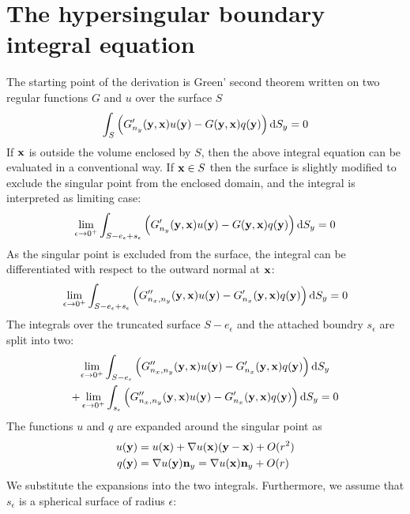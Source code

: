 \documentclass[a4paper,11pt]{article}
\newcommand{\td}{\mathrm{d}}
\begin{document}
\section{The hypersingular boundary integral equation}

The starting point of the derivation is Green' second theorem written on two regular functions $G$ and $u$ over the surface $S$
%
\begin{equation}
\int_{S} \left( G'_{n_y}({\bf y}, {\bf x}) u({\bf y}) - G({\bf y}, {\bf x}) q({\bf y})
\right) \td S_y = 0
\end{equation}
%
If ${\bf x}$ is outside the volume enclosed by $S$, then the above integral equation can be evaluated in a conventional way.
If ${\bf x} \in S$ then the surface is slightly modified to exclude the singular point from the enclosed domain, and the integral is interpreted as limiting case:
%
\begin{equation}
\lim_{\epsilon \to 0^+}
\int_{S-e_{\epsilon}+s_{\epsilon}}
\left(
G'_{n_y}({\bf y}, {\bf x}) u({\bf y}) - G({\bf y}, {\bf x}) q({\bf y})
\right) 
\td S_y = 0
\end{equation}
%
As the singular point is excluded from the surface, the integral can be differentiated with respect to the outward normal at ${\bf x}$:
%
\begin{equation}
\lim_{\epsilon \to 0^+}
\int_{S-e_{\epsilon}+s_{\epsilon}}
\left(
G''_{n_x,n_y}({\bf y}, {\bf x}) u({\bf y}) - G'_{n_x}({\bf y}, {\bf x}) q({\bf y})
\right)
\td S_y = 0
\end{equation}
%
The integrals over the truncated surface $S-e_{\epsilon}$ and the attached boundry $s_{\epsilon}$ are split into two:
%
\begin{multline}
\lim_{\epsilon \to 0^+}
\int_{S-e_{\epsilon}}
\left(
G''_{n_x,n_y}({\bf y}, {\bf x}) u({\bf y}) - G'_{n_x}({\bf y}, {\bf x}) q({\bf y})
\right)
\td S_y
\\
+
\lim_{\epsilon \to 0^+}
\int_{s_{\epsilon}}
\left(
G''_{n_x,n_y}({\bf y}, {\bf x}) u({\bf y}) - G'_{n_x}({\bf y}, {\bf x}) q({\bf y})
\right)
\td S_y = 0
\end{multline}
%
The functions $u$ and $q$ are expanded around the singular point as
%
\begin{align}
u({\bf y}) &= u({\bf x}) + \nabla u({\bf x}) ({\bf y} - {\bf x}) + O(r^2) \nonumber \\
q({\bf y}) &= \nabla u({\bf y}) {\bf n}_y = \nabla u({\bf x}) {\bf n}_y + O(r)
\end{align}
%
We substitute the expansions into the two integrals. Furthermore, we assume that $s_{\epsilon}$ is a spherical surface of radius $\epsilon$:
\end{document}

